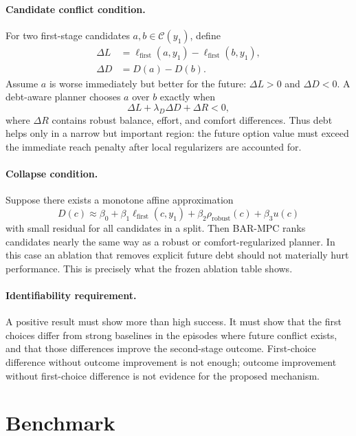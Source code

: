 \documentclass{article}
\newcommand{\method}{\textsc{BAR-MPC}}
\newcommand{\debt}{D}
\newcommand{\candidateSet}{\mathcal{C}}
\newcommand{\target}{y}
\begin{document}
\paragraph{Candidate conflict condition.}
For two first-stage candidates $a,b\in\candidateSet(\target_1)$, define
\begin{align}
  \Delta L &= \ell_{\mathrm{first}}(a,\target_1)-\ell_{\mathrm{first}}(b,\target_1),\\
  \Delta D &= \debt(a)-\debt(b).
\end{align}
Assume $a$ is worse immediately but better for the future: $\Delta L>0$ and $\Delta D<0$. A debt-aware planner chooses $a$ over $b$ exactly when
\begin{equation}
  \Delta L + \lambda_D \Delta D + \Delta R < 0,
\end{equation}
where $\Delta R$ contains robust balance, effort, and comfort differences. Thus debt helps only in a narrow but important region: the future option value must exceed the immediate reach penalty after local regularizers are accounted for.

\paragraph{Collapse condition.}
Suppose there exists a monotone affine approximation
\begin{equation}
  \debt(c) \approx \beta_0+\beta_1\ell_{\mathrm{first}}(c,\target_1)+\beta_2\rho_{\mathrm{robust}}(c)+\beta_3u(c)
\end{equation}
with small residual for all candidates in a split. Then \method{} ranks candidates nearly the same way as a robust or comfort-regularized planner. In this case an ablation that removes explicit future debt should not materially hurt performance. This is precisely what the frozen ablation table shows.

\paragraph{Identifiability requirement.}
A positive result must show more than high success. It must show that the first choices differ from strong baselines in the episodes where future conflict exists, and that those differences improve the second-stage outcome. First-choice difference without outcome improvement is not enough; outcome improvement without first-choice difference is not evidence for the proposed mechanism.

\section{Benchmark}
\end{document}
